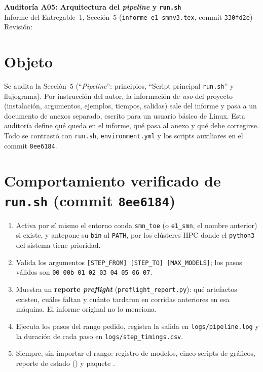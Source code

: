 \newcommand{\auditoriaid}{A05 -- Arquitectura y run.sh}



\begin{center}
{\Large\bfseries Auditoría A05: Arquitectura del \emph{pipeline} y \texttt{run.sh}}\\[0.4em]
{\normalsize Informe del Entregable~1, Sección~5 (\texttt{informe\_e1\_smnv3.tex}, commit \texttt{330fd2e})}\\[0.2em]
{\small Revisión: \fechaentrega}
\end{center}

\section{Objeto}

Se audita la Sección~5 (``\emph{Pipeline}'': principios, ``Script principal \texttt{run.sh}'' y flujograma). Por instrucción del autor, la información de \emph{uso} del proyecto (instalación, argumentos, ejemplos, tiempos, salidas) sale del informe y pasa a un documento de anexos separado, escrito para un usuario básico de Linux. Esta auditoría define qué queda en el informe, qué pasa al anexo y qué debe corregirse. Todo se contrastó con \texttt{run.sh}, \texttt{environment.yml} y los scripts auxiliares en el commit \texttt{8ee6184}.


\section{Comportamiento verificado de \texttt{run.sh} (commit \texttt{8ee6184})}

\begin{enumerate}[leftmargin=1.4em]
\item Activa por sí mismo el entorno conda \texttt{smn\_toe} (o \texttt{e1\_smn}, el nombre anterior) si existe, y antepone su \texttt{bin} al \texttt{PATH}, por los clústeres HPC donde el \texttt{python3} del sistema tiene prioridad.
\item Valida los argumentos \texttt{[STEP\_FROM] [STEP\_TO] [MAX\_MODELS]}; los pasos válidos son \texttt{00 00b 01 02 03 04 05 06 07}.
\item Muestra un \textbf{reporte \emph{preflight}} (\texttt{preflight\_report.py}): qué artefactos existen, cuáles faltan y cuánto tardaron en corridas anteriores en esa máquina. El informe original no lo menciona.
\item Ejecuta los pasos del rango pedido, registra la salida en \texttt{logs/pipeline.log} y la duración de cada paso en \texttt{logs/step\_timings.csv}.
\item Siempre, sin importar el rango: registro de modelos, cinco scripts de gráficos, reporte de estado () y paquete .
\end{enumerate}

